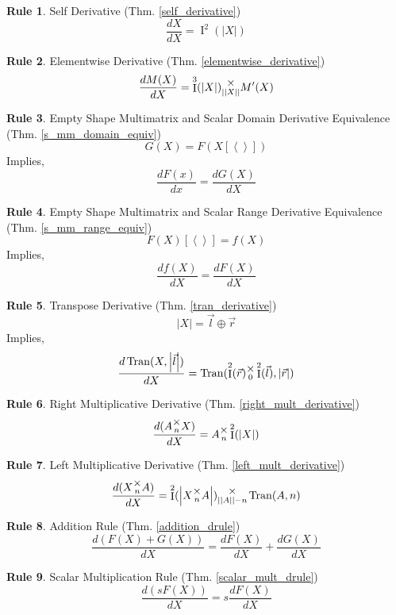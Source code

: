 \documentclass[12pt]{book}
\theoremstyle{plain}
\theoremstyle{definition}
\newtheorem{drule}{Rule}
\theoremstyle{ppart}
\theoremstyle{case}
\theoremstyle{solution}
\DeclareMathOperator{\Ident}{I}
\DeclareMathOperator{\Tran}{Tran}
\newcommand{\mmult}[1]{\text{\raisebox{1ex}{$\underset{#1}{\times}$}}}
\newcommand{\shape}[1]{\left|#1\right|}
\begin{document}
\begin{appendices}
\begin{drule}
Self Derivative (Thm. \ref{self_derivative})
\[ \frac{dX}{dX} = \Ident^2(\shape{X}) \]
\end{drule}

\begin{drule}
Elementwise Derivative (Thm. \ref{elementwise_derivative})
\[ \frac{dM(X)}{dX} = \Ident^3(\shape{X}) \mmult{\shape{\shape{X}}} M'(X) \]
\end{drule}

\begin{drule}
Empty Shape Multimatrix and Scalar Domain Derivative Equivalence
(Thm. \ref{s_mm_domain_equiv})
\[ G(X) = F(X[\left<\right>]) \]
Implies,
\[ \frac{dF(x)}{dx} = \frac{dG(X)}{dX} \]
\end{drule}

\begin{drule}
Empty Shape Multimatrix and Scalar Range Derivative Equivalence
(Thm. \ref{s_mm_range_equiv})
\[ F(X)[\left<\right>] = f(X) \]
Implies,
\[ \frac{df(X)}{dX} = \frac{dF(X)}{dX} \]
\end{drule}

\begin{drule}
Transpose Derivative
(Thm. \ref{tran_derivative})
\[ \shape{X} = \vec{l} \oplus \vec{r} \]
Implies,
\[
 \frac{d\Tran(X, \shape{\vec{l}})}{dX} =
 \Tran(\Ident^2(\vec{r}) \mmult{0} \Ident^2(\vec{l}), \shape{\vec{r}})
\]
\end{drule}

\begin{drule}
Right Multiplicative Derivative
(Thm. \ref{right_mult_derivative})
\[ \frac{d(A \mmult{n} X)}{dX} = A \mmult{n} \Ident^2(\shape{X}) \]
\end{drule}

\begin{drule}
Left Multiplicative Derivative
(Thm. \ref{left_mult_derivative})
\[ \frac{d(X \mmult{n} A)}{dX} = \Ident^2(\shape{X \mmult{n} A}) \mmult{\shape{\shape{A}}-n} \Tran(A, n) \]
\end{drule}

\begin{drule}
Addition Rule
(Thm. \ref{addition_drule})
\[ \frac{d(F(X) + G(X))}{dX} = \frac{dF(X)}{dX} + \frac{dG(X)}{dX} \]
\end{drule}

\begin{drule}
Scalar Multiplication Rule
(Thm. \ref{scalar_mult_drule})
\[ \frac{d(sF(X))}{dX} = s\frac{dF(X)}{dX} \]
\end{drule}


\end{appendices}
\end{document}
